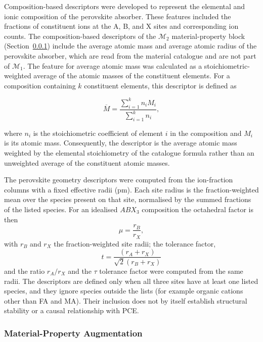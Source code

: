 \documentclass[3p]{elsarticle}
\begin{document}
Composition-based descriptors were developed to represent the elemental and ionic composition of the perovskite absorber. These features included the fractions of constituent ions at the A, B, and X sites and corresponding ion counts. The composition-based descriptors of the $\mathcal{M}_2$ material-property block (Section~\ref{sec:matprop}) include the average atomic mass and average atomic radius of the perovskite absorber, which are read from the material catalogue and are not part of $\mathcal{M}_1$. The feature for average atomic mass was calculated as a stoichiometric-weighted average of the atomic masses of the constituent elements. For a composition containing \(k\) constituent elements, this descriptor is defined as

\[
\overline{M}=\frac{\sum_{i=1}^{k} n_i M_i}{\sum_{i=1}^{k} n_i},
\]

where \(n_i\) is the stoichiometric coefficient of element \(i\) in the composition and \(M_i\) is its atomic mass. Consequently, the descriptor is the average atomic mass weighted by the elemental stoichiometry of the catalogue formula rather than an unweighted average of the constituent atomic masses.

The perovskite geometry descriptors were computed from the ion-fraction columns with a fixed effective radii (pm). Each site radius is the fraction-weighted mean over the species present on that site, normalised by the summed fractions of the listed species. For an idealised \(ABX_3\) composition the octahedral factor is then
\[
\mu=\frac{r_B}{r_X},
\]
with \(r_B\) and \(r_X\) the fraction-weighted site radii; the tolerance factor,
\[
t=\frac{(r_A+r_X)}{\sqrt{2}(r_B+r_X)}
\]
and the ratio \(r_A/r_X\) and the \(\tau\) tolerance factor were computed from the same radii.  The descriptors are defined only when all three sites have at least one listed species, and they ignore species outside the lists (for example organic cations other than FA and MA). Their inclusion does not by itself establish structural stability or a causal relationship with PCE.

\subsubsection{Material-Property Augmentation}
\label{sec:matprop}
\end{document}
